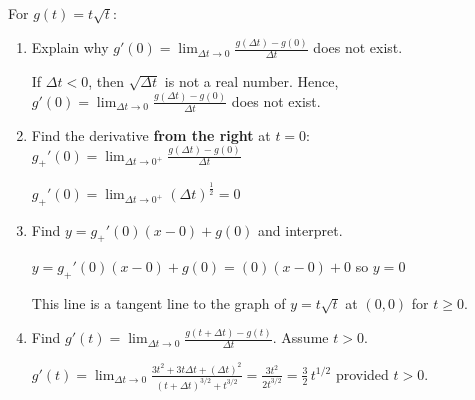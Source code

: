 \documentclass{ximera}
\begin{document}
\begin{problem} For  $g(t) = t \sqrt{t}$:

\begin{enumerate}

\item  Explain why $g'(0) = \lim_{\Delta t \rightarrow 0} \frac{g(\Delta t) - g(0)}{\Delta t}$ does not exist.

\begin{solution}
If $\Delta t < 0$, then $\sqrt{\Delta t}$ is not a real number.  Hence, $g'(0) = \lim_{\Delta t \rightarrow 0} \frac{g(\Delta t) - g(0)}{\Delta t}$ does not exist.
\end{solution}

\item \label{derivativefromrightexercise} Find the  derivative \textbf{from the right} at $t=0$:  $g_{+}'(0) = \lim_{\Delta t \rightarrow 0^{+}} \frac{g(\Delta t) - g(0)}{\Delta t}$

\begin{solution}
 $g_{+}'(0) =\lim_{\Delta t \rightarrow 0^{+}} (\Delta t)^{\frac{1}{2}}   =  0$
\end{solution}

\item  Find $y = g_{+}'(0) (x-0) + g(0)$ and interpret.

\begin{solution}
 $y = g_{+}'(0) (x - 0) + g(0) =  (0) (x-0) + 0$ so $y = 0$

 This line is a tangent line to the graph of $y = t \sqrt{t}$ at $(0,0)$ for $t \geq 0$.
\end{solution}

\item Find  $g'(t) =  \lim_{\Delta t \rightarrow 0} \frac{g(t+\Delta t) - g(t)}{\Delta t}$.  Assume $t>0$.

\begin{solution}
$g'(t) =\lim_{\Delta t \rightarrow 0}\frac{3t^2+3t\Delta t+(\Delta t)^2}{(t+\Delta t)^{3/2} + t^{3/2}} = \frac{3t^2}{2 t^{3/2}} = \frac{3}{2} \, t^{1/2}$ provided $t > 0$.
\end{solution}

\end{enumerate}

\end{problem}
\end{document}
